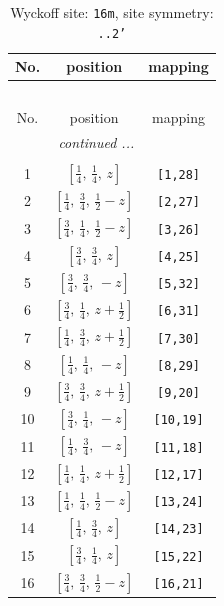 \documentclass[fleqn,8pt]{jsarticle}
\begin{document}
\begin{longtable}{ccc}
\caption{Wyckoff site: {\tt 16m}, site symmetry: {\tt ..2'}}
 \\
 \hline \hline
No. & position & mapping \\ \hline \endfirsthead

\multicolumn{2}{l}{\tablename\ \thetable{}} \\
 \hline \hline
No. & position & mapping \\ \hline \endhead

 \hline \hline
\multicolumn{2}{r}{\footnotesize\it continued ...} \\ \endfoot

 \hline \hline
\multicolumn{2}{r}{} \\ \endlastfoot

1 & $\left[ \frac{1}{4},\, \frac{1}{4},\, z \right]$ & {\tt [1,28]} \\ \hline
2 & $\left[ \frac{1}{4},\, \frac{3}{4},\, \frac{1}{2} - z \right]$ & {\tt [2,27]} \\ \hline
3 & $\left[ \frac{3}{4},\, \frac{1}{4},\, \frac{1}{2} - z \right]$ & {\tt [3,26]} \\ \hline
4 & $\left[ \frac{3}{4},\, \frac{3}{4},\, z \right]$ & {\tt [4,25]} \\ \hline
5 & $\left[ \frac{3}{4},\, \frac{3}{4},\, - z \right]$ & {\tt [5,32]} \\ \hline
6 & $\left[ \frac{3}{4},\, \frac{1}{4},\, z + \frac{1}{2} \right]$ & {\tt [6,31]} \\ \hline
7 & $\left[ \frac{1}{4},\, \frac{3}{4},\, z + \frac{1}{2} \right]$ & {\tt [7,30]} \\ \hline
8 & $\left[ \frac{1}{4},\, \frac{1}{4},\, - z \right]$ & {\tt [8,29]} \\ \hline
9 & $\left[ \frac{3}{4},\, \frac{3}{4},\, z + \frac{1}{2} \right]$ & {\tt [9,20]} \\ \hline
10 & $\left[ \frac{3}{4},\, \frac{1}{4},\, - z \right]$ & {\tt [10,19]} \\ \hline
11 & $\left[ \frac{1}{4},\, \frac{3}{4},\, - z \right]$ & {\tt [11,18]} \\ \hline
12 & $\left[ \frac{1}{4},\, \frac{1}{4},\, z + \frac{1}{2} \right]$ & {\tt [12,17]} \\ \hline
13 & $\left[ \frac{1}{4},\, \frac{1}{4},\, \frac{1}{2} - z \right]$ & {\tt [13,24]} \\ \hline
14 & $\left[ \frac{1}{4},\, \frac{3}{4},\, z \right]$ & {\tt [14,23]} \\ \hline
15 & $\left[ \frac{3}{4},\, \frac{1}{4},\, z \right]$ & {\tt [15,22]} \\ \hline
16 & $\left[ \frac{3}{4},\, \frac{3}{4},\, \frac{1}{2} - z \right]$ & {\tt [16,21]} \\
\end{longtable}
\end{document}

